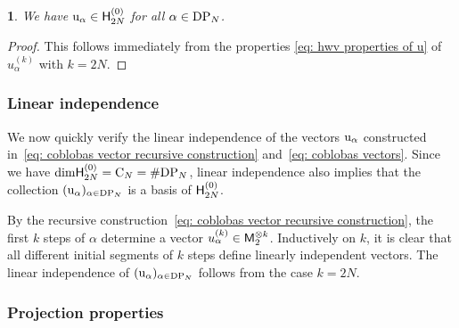\documentclass[oneside,english]{amsart}
\numberwithin{equation}{section}
\numberwithin{figure}{section}
\theoremstyle{plain}
\theoremstyle{plain}
\theoremstyle{plain}
\theoremstyle{remark}
\theoremstyle{plain}
\theoremstyle{plain}
\newtheorem{cor}[lem]{\protect\corollaryname}
\theoremstyle{plain}
\theoremstyle{plain}
\theoremstyle{plain}
\theoremstyle{plain}
\theoremstyle{plain}
\theoremstyle{plain}
\providecommand{\corollaryname}{Corollary}
\newcommand{\red}[1]{{\color{red} #1}}
\begin{document}

\begin{cor} \label{cor: coblo walk hwv properties}
We have $\mathrm{u}_\alpha \in \mathsf{H}_{2N}^{(0)}$ 
for all $\alpha \in \mathrm{DP}_N$.
\end{cor}
\begin{proof}
This follows immediately from the properties
\eqref{eq: hwv properties of u} of $u_{\alpha}^{(k)}$ with $k = 2N$.
\end{proof}


\subsubsection{\label{sss: linear independence}\textbf{Linear independence}}

We now quickly verify the linear independence of the
vectors $\mathrm{u}_\alpha$ constructed in~\eqref{eq: coblobas vector recursive construction}
and~\eqref{eq: coblobas vectors}.
Since we have $\mathrm{dim} \mathsf{H}_{2N}^{(0)} = \mathrm{C}_N = \# \mathrm{DP}_N$,
linear independence also implies that the collection
$(\mathrm{u}_\alpha)_{\alpha \in \mathrm{DP}_N}$ is a basis of $\mathsf{H}_{2N}^{(0)}$.

By the recursive construction~\eqref{eq: coblobas vector recursive construction},
the first $k$ steps of $\alpha$ determine a vector $u_\alpha^{(k)} \in \mathsf{M}_2^{\otimes k}$.
Inductively on $k$, it is clear that all different initial segments of $k$ steps
define linearly independent vectors. The linear independence of
$(\mathrm{u}_\alpha)_{\alpha \in \mathrm{DP}_N}$ follows from the case $k=2N$.


\subsubsection{\textbf{Projection properties}}
\end{document}
